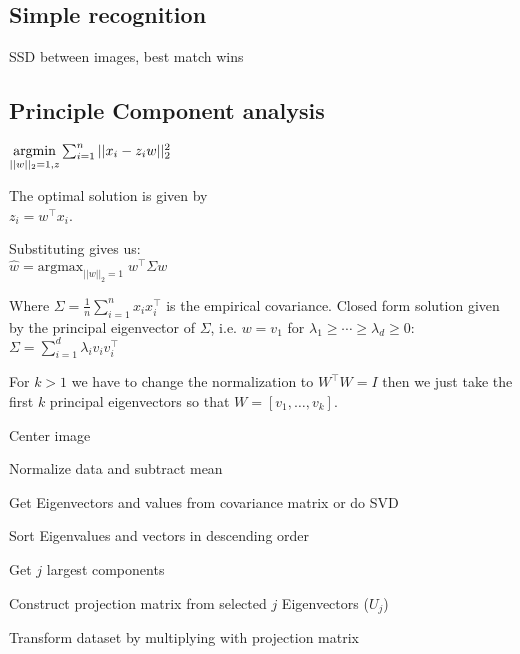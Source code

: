 \subsection*{Simple recognition}
SSD between images, best match wins 
\subsection*{Principle Component analysis }



$\underset{||w||_2 = 1, z}{\text{argmin}} \sum_{i=1}^n ||x_i - z_i w||_2^2$

The optimal solution is given by \\
$z_i = w^\top x_i$.  

Substituting gives us:\\
\qquad \qquad $\hat{w} = \text{argmax}_{||w||_2=1} \; w^\top \Sigma w$

Where $\Sigma = \frac{1}{n} \sum_{i=1}^n x_i x_i^\top$ is the empirical covariance. Closed form solution given by the principal eigenvector of $\Sigma$, i.e. $w = v_1$ for $\lambda_1 \geq \cdots \geq \lambda_d \geq 0$:
$\Sigma = \sum_{i=1}^d \lambda_i v_i v_i^\top$

For $k > 1$ we have to change the normalization to $W^\top W = I$ then we just take the first $k$ principal eigenvectors so that $W = [v_1, \ldots, v_k]$.


\begin{compactitem}
    \item Center image
    \item Normalize data and subtract mean 
    \item Get Eigenvectors and values from covariance matrix or do SVD
    \item Sort Eigenvalues and vectors in descending order
    \item Get $j$ largest components
    \item Construct projection matrix from selected $j$ Eigenvectors ($U_j$)
    \item Transform dataset by multiplying with projection matrix
\end{compactitem}

